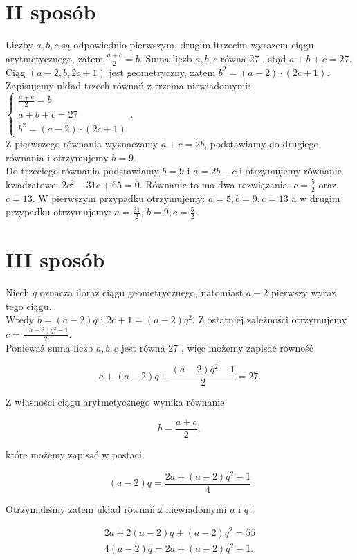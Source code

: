 \documentclass[10pt]{article}
\begin{document}
\section*{II sposób}
Liczby $a, b, c$ są odpowiednio pierwszym, drugim itrzecim wyrazem ciągu arytmetycznego, zatem $\frac{a+c}{2}=b$. Suma liczb $a, b, c$ równa 27 , stąd $a+b+c=27$. Ciąg $(a-2, b, 2 c+1)$ jest geometryczny, zatem $b^{2}=(a-2) \cdot(2 c+1)$.\\
Zapisujemy układ trzech równań z trzema niewiadomymi: $\left\{\begin{array}{l}\frac{a+c}{2}=b \\ a+b+c=27 \\ b^{2}=(a-2) \cdot(2 c+1)\end{array}\right.$.\\
Z pierwszego równania wyznaczamy $a+c=2 b$, podstawiamy do drugiego równania i otrzymujemy $b=9$.\\
Do trzeciego równania podstawiamy $b=9$ i $a=2 b-c$ i otrzymujemy równanie kwadratowe: $2 c^{2}-31 c+65=0$. Równanie to ma dwa rozwiązania: $c=\frac{5}{2}$ oraz $c=13$. W pierwszym przypadku otrzymujemy: $a=5, b=9, c=13$ a w drugim przypadku otrzymujemy: $a=\frac{31}{2}$, $b=9, c=\frac{5}{2}$.

\section*{III sposób}
Niech $q$ oznacza iloraz ciągu geometrycznego, natomiast $a-2$ pierwszy wyraz tego ciągu.\\
Wtedy $b=(a-2) q$ i $2 c+1=(a-2) q^{2}$. Z ostatniej zależności otrzymujemy $c=\frac{(a-2) q^{2}-1}{2}$.\\
Ponieważ suma liczb $a, b, c$ jest równa 27 , więc możemy zapisać równość

$$
a+(a-2) q+\frac{(a-2) q^{2}-1}{2}=27 .
$$

Z własności ciągu arytmetycznego wynika równanie

$$
b=\frac{a+c}{2},
$$

które możemy zapisać w postaci

$$
(a-2) q=\frac{2 a+(a-2) q^{2}-1}{4}
$$

Otrzymaliśmy zatem układ równań z niewiadomymi $a$ i $q$ :

$$
\begin{gathered}
2 a+2(a-2) q+(a-2) q^{2}=55 \\
4(a-2) q=2 a+(a-2) q^{2}-1 .
\end{gathered}
$$
\end{document}
